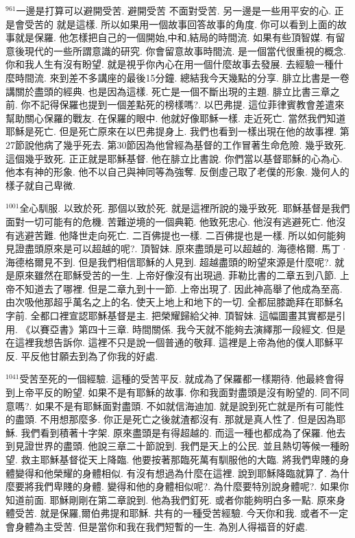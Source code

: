 \documentclass{book}
\begin{document}
$^{961}$一邊是打算可以避開受苦.
避開受苦 不面對受苦.
另一邊是一些用平安的心.
正是會受苦的 就是這樣.
所以如果用一個故事回答故事的角度.
你可以看到上面的故事就是保羅.
他怎樣把自己的一個開始,中和,結局的時間流.
如果有些頂智媒.
有留意後現代的一些所謂意識的研究.
你會留意故事時間流.
是一個當代很重視的概念.
你和我人生有沒有盼望.
就是視乎你內心在用一個什麼故事去發展.
去經驗一種什麼時間流.
來到差不多講座的最後15分鐘.
總結我今天幾點的分享.
腓立比書是一卷講關於盡頭的經典.
也是因為這樣.
死亡是一個不斷出現的主題.
腓立比書三章之前.
你不記得保羅也提到一個差點死的榜樣嗎?.
以巴弗提.
這位菲律賓教會差遣來幫助關心保羅的戰友.
在保羅的眼中.
他就好像耶穌一樣.
走近死亡.
當然我們知道耶穌是死亡.
但是死亡原來在以巴弗提身上.
我們也看到一樣出現在他的故事裡.
第27節說他病了幾乎死去.
第30節因為他曾經為基督的工作冒著生命危險.
幾乎致死.
這個幾乎致死.
正正就是耶穌基督.
他在腓立比書說.
你們當以基督耶穌的心為心.
他本有神的形象.
他不以自己與神同等為強奪.
反倒虛己取了老僕的形象.
幾何人的樣子就自己卑微.

$^{1001}$全心馴服.
以致於死.
那個以致於死.
就是這裡所說的幾乎致死.
耶穌基督是我們面對一切可能有的危機.
苦難逆境的一個典範.
他致死忠心.
他沒有逃避死亡.
他沒有逃避苦難.
他降世走向死亡.
二百佛提也一樣.
二百佛提也是一樣.
所以如何能夠見證盡頭原來是可以超越的呢?.
頂智妹.
原來盡頭是可以超越的.
海德格爾.
馬丁·海德格爾見不到.
但是我們相信耶穌的人見到.
超越盡頭的盼望來源是什麼呢?.
就是原來雖然在耶穌受苦的一生.
上帝好像沒有出現過.
菲勒比書的二章五到八節.
上帝不知道去了哪裡.
但是二章九到十一節.
上帝出現了.
因此神高舉了他成為至高.
由次吸他那超乎萬名之上的名.
使天上地上和地下的一切.
全都屈膝跪拜在耶穌名字前.
全都口裡宣認耶穌基督是主.
把榮耀歸給父神.
頂智妹.
這幅圖畫其實都是引用.
《以賽亞書》第四十三章.
時間關係.
我今天就不能夠去演繹那一段經文.
但是在這裡我想告訴你.
這裡不只是說一個普通的敬拜.
這裡是上帝為他的僕人耶穌平反.
平反他甘願去到為了你我的好處.

$^{1041}$受苦至死的一個經驗.
這種的受苦平反.
就成為了保羅都一樣期待.
他最終會得到上帝平反的盼望.
如果不是有耶穌的故事.
你和我面對盡頭是沒有盼望的.
同不同意嗎?.
如果不是有耶穌面對盡頭.
不如就信海迪加.
就是說到死亡就是所有可能性的盡頭.
不用想那麼多.
你正是死亡之後就渣都沒有.
那就是真人性了.
但是因為耶穌.
我們看到積著十字架.
原來盡頭是有得超越的.
而這一種也都成為了保羅.
他去到見證世界的盡頭.
他說三章二十節說到.
我們是天上的公民.
並且熱切等候一種盼望.
救主耶穌基督從天上降臨.
他要按著那臨死萬有馴服他的大臨.
將我們卑賤的身體變得和他榮耀的身體相似.
有沒有想過為什麼在這裡.
說到耶穌降臨就算了.
為什麼要將我們卑賤的身體.
變得和他的身體相似呢?.
為什麼要特別說身體呢?.
如果你知道前面.
耶穌剛剛在第二章說到.
他為我們釘死.
或者你能夠明白多一點.
原來身體受苦.
就是保羅,爾伯弗提和耶穌.
共有的一種受苦經驗.
今天你和我.
或者不一定會身體為主受苦.
但是當你和我在我們短暫的一生.
為別人得福音的好處.
\end{document}
